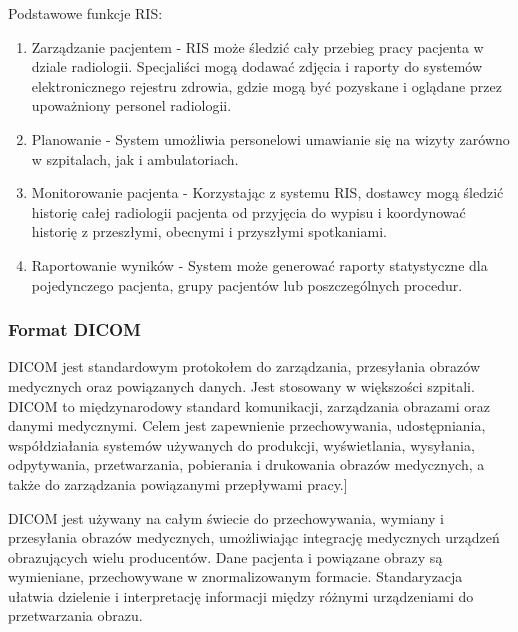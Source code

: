 \documentclass[a4paper,11pt,twoside]{report}
\theoremstyle{definition}
\begin{document}
Podstawowe funkcje RIS:
\begin{enumerate}
\item Zarządzanie pacjentem - RIS może śledzić cały przebieg pracy pacjenta w dziale radiologii. Specjaliści mogą dodawać zdjęcia i raporty do systemów elektronicznego rejestru zdrowia, gdzie mogą być pozyskane i oglądane przez upoważniony personel radiologii.
\item Planowanie - System umożliwia personelowi umawianie się na wizyty zarówno w szpitalach, jak i ambulatoriach.
\item Monitorowanie pacjenta - Korzystając z systemu RIS, dostawcy mogą śledzić historię całej radiologii pacjenta od przyjęcia do wypisu i koordynować historię z przeszłymi, obecnymi i przyszłymi spotkaniami.
\item Raportowanie wyników - System może generować raporty statystyczne dla pojedynczego pacjenta, grupy pacjentów lub poszczególnych procedur.
\end{enumerate}

\subsubsection{Format DICOM}

DICOM jest standardowym protokołem do zarządzania,  przesyłania obrazów medycznych oraz powiązanych danych.  Jest stosowany w większości szpitali. DICOM to międzynarodowy standard komunikacji, zarządzania obrazami oraz danymi medycznymi. Celem jest zapewnienie przechowywania, udostępniania, współdziałania systemów używanych do produkcji, wyświetlania, wysyłania, odpytywania, przetwarzania, pobierania i drukowania obrazów medycznych, a także do zarządzania powiązanymi przepływami pracy.\cite{standardDICOM}]
\par
DICOM jest używany na całym świecie do przechowywania, wymiany i przesyłania obrazów medycznych, umożliwiając integrację medycznych urządzeń obrazujących wielu producentów. Dane pacjenta i powiązane obrazy są wymieniane, przechowywane w znormalizowanym formacie.
Standaryzacja ułatwia dzielenie i interpretację informacji między różnymi urządzeniami do przetwarzania obrazu.
\end{document}
